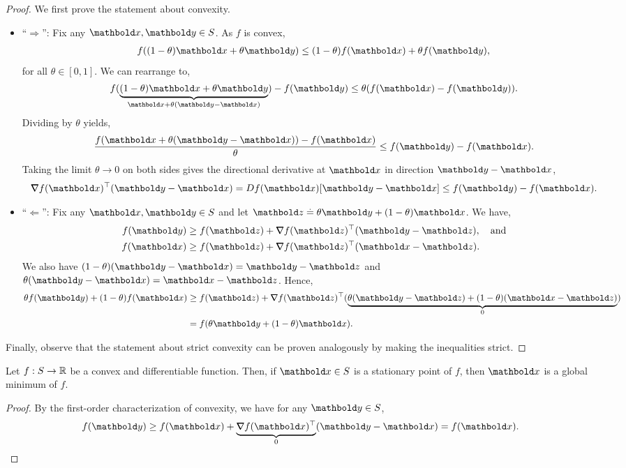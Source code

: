 \begin{proof} We first prove the statement about convexity. \begin{itemize}
    \item ``$\Rightarrow$'': Fix any $\vx, \vy \in \sS$. As $f$ is convex, \begin{align*}
        f((1-\theta)\vx + \theta\vy) \leq (1-\theta)f(\vx) + \theta f(\vy),
    \end{align*} for all $\theta \in [0,1]$. We can rearrange to, \begin{align*}
        f(\underbrace{(1-\theta)\vx + \theta\vy}_{\vx + \theta(\vy - \vx)}) - f(\vy) \leq \theta(f(\vx) - f(\vy)).
    \end{align*} Dividing by $\theta$ yields, \begin{align*}
        \frac{f(\vx + \theta(\vy - \vx)) - f(\vx)}{\theta} \leq f(\vy) - f(\vx).
    \end{align*} Taking the limit $\theta \to 0$ on both sides gives the directional derivative at $\vx$ in direction $\vy - \vx$, \begin{align*}
        \trans{\grad f(\vx)}(\vy - \vx) = D f(\vx)[\vy - \vx] \leq f(\vy) - f(\vx).
    \end{align*}
    
    \item ``$\Leftarrow$'': Fix any $\vx, \vy \in \sS$ and let $\vz \defeq \theta\vy + (1-\theta)\vx$. We have, \begin{align*}
        f(\vy) &\geq f(\vz) + \trans{\grad f(\vz)}(\vy - \vz), \quad\text{and} \\
        f(\vx) &\geq f(\vz) + \trans{\grad f(\vz)}(\vx - \vz).
    \end{align*} We also have $(1-\theta)(\vy-\vx) = \vy - \vz$ and $\theta(\vy - \vx) = \vx - \vz$. Hence, \begin{align*}
        \theta f(\vy) + (1-\theta) f(\vx) &\geq f(\vz) + \trans{\grad f(\vz)}(\underbrace{\theta(\vy - \vz) + (1-\theta)(\vx - \vz)}_{0}) \\
        &= f(\theta\vy + (1-\theta)\vx).
    \end{align*}
\end{itemize}

Finally, observe that the statement about strict convexity can be proven analogously by making the inequalities strict.
\end{proof}

\begin{thm} Let $f: S \to \mathbb{R}$ be a convex and differentiable function. Then, if $\vx \in \sS$ is a stationary point of $f$, then $\vx$ is a global minimum of $f$.
\end{thm}
\begin{proof} By the first-order characterization of convexity, we have for any $\vy \in \sS$, \begin{align*}
    f(\vy) \geq f(\vx) + \underbrace{\trans{\grad f(\vx)}}_{0}(\vy - \vx) = f(\vx). &\qedhere
\end{align*}
\end{proof}

